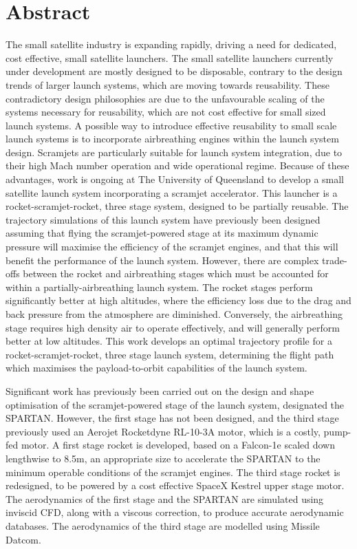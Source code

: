 \cleardoublepage

\section*{Abstract}

 The small satellite industry is expanding rapidly, driving a need for dedicated, cost effective, small satellite launchers. The small satellite launchers currently under development are mostly designed to be disposable,  contrary to the design trends of larger launch systems, which are moving towards reusability. These contradictory design philosophies are due to the unfavourable scaling of the systems necessary for reusability, which are not cost effective for small sized launch systems. 
 A possible way to introduce effective reusability to small scale launch systems is to incorporate airbreathing engines within the launch system design. Scramjets are particularly suitable for launch system integration, due to their high Mach number operation and wide operational regime. 
 Because of these advantages, work is ongoing at The University of Queensland to develop a small satellite launch system incorporating a scramjet accelerator. This launcher is a rocket-scramjet-rocket, three stage system, designed to be partially reusable. 
 The trajectory simulations of this launch system have previously been designed assuming that flying the scramjet-powered stage at its maximum dynamic pressure will maximise the efficiency of the scramjet engines, and that this will benefit the performance of the launch system. 
 However, there are complex trade-offs between the rocket and airbreathing stages which must be accounted for within a partially-airbreathing launch system. The rocket stages perform significantly better at high altitudes, where the efficiency loss due to the drag and back pressure from the atmosphere are diminished. Conversely, the airbreathing stage requires high density air to operate effectively, and will generally perform better at low altitudes. 
 This work develops an optimal trajectory profile for a rocket-scramjet-rocket, three stage launch system, determining the flight path which maximises the payload-to-orbit capabilities of the launch system. 
 
 Significant work has previously been carried out on the design and shape optimisation of the scramjet-powered stage of the launch system, designated the SPARTAN. 
 However, the first stage has not been designed, and the third stage previously used an Aerojet Rocketdyne RL-10-3A motor, which is a costly, pump-fed motor. 
 A first stage rocket is developed, based on a Falcon-1e scaled down lengthwise to 8.5m, an appropriate size to accelerate the SPARTAN to the minimum operable conditions of the scramjet engines. The third stage rocket is redesigned, to be powered by a cost effective SpaceX Kestrel upper stage motor. 
 The aerodynamics of the first stage and the SPARTAN are simulated using inviscid CFD, along with a viscous correction, to produce accurate aerodynamic databases.  
 The aerodynamics of the third stage are modelled using Missile Datcom.
 
